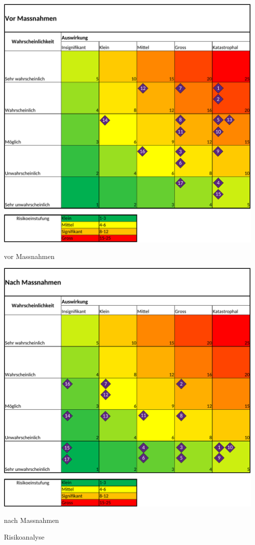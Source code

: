 \begin{table}[H]
\centering
\begin{subtable}{0.49\textwidth}
\centering
\includegraphics[width=0.99\linewidth]{assets/Risikoanalyse_vor_Massnahmen.pdf}
\caption{vor Massnahmen}
\label{table:risk-before}
\end{subtable}
\begin{subtable}{0.49\textwidth}
\centering
\includegraphics[width=0.99\linewidth]{assets/Risikoanalyse_nach_Massnahmen.pdf}
\caption{nach Massnahmen}
\label{table:risk-after}
\end{subtable}
\caption{Risikoanalyse}
\label{table:risk-table}
\end{table}

